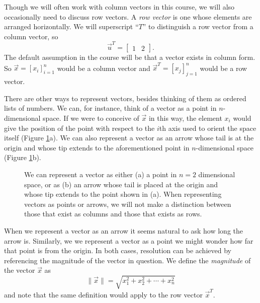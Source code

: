 \documentclass[../book.tex]{subfiles}
\begin{document}
Though we will often work with column vectors in this course, we will also occasionally need to discuss row vectors. A \emph{row vector} is one whose elements are arranged horizontally. We will superscript ``\(T\)'' to distinguish a row vector from a column vector, so
\begin{equation}\label{eq:vec-3}
\vec{u}^{ T} 
=
\begin{bmatrix}
  1 & 2
\end{bmatrix}.
\end{equation}
The default assumption in the course will be that a vector exists in column form. So \(\vec{x} = [x_i]_{i=1}^n\) would be a column vector and \(\vec{x}^{ T} = [x_j]_{j=1}^n\) would be a row vector.

There are other ways to represent vectors, besides thinking of them as ordered lists of numbers. We can, for instance, think of a vector as a point in \(n\)-dimensional space. If we were to conceive of \(\vec{x}\) in this way, the element \(x_i\) would give the position of the point with respect to the \(i\)th axis used to orient the space itself (Figure \ref{fig:vector_rep}a). We can also represent a vector as an arrow whose tail is at the origin and whose tip extends to the aforementioned point in \(n\)-dimensional space (Figure \ref{fig:vector_rep}b).

\begin{figure}[htbp]
  \centering
  \caption{We can represent a vector as either (a) a point in \(n=2\) dimensional space, or as (b) an arrow whose tail is placed at the origin and whose tip extends to the point shown in (a). When representing vectors as points or arrows, we will not make a distinction between those that exist as columns and those that exists as rows.}
  \label{fig:vector_rep}
\end{figure}

When we represent a vector as an arrow it seems natural to ask how long the arrow is. Similarly, we we represent a vector as a point we might wonder how far that point is from the origin. In both cases, resolution can be achieved by referencing the magnitude of the vector in question. We define the \emph{magnitude} of the vector \(\vec{x}\) as
\begin{equation}\label{eq:vec-4}
\| \vec{x}\| = \sqrt{ x_1^2 + x_2^2 + \cdots + x_n^2 }
\end{equation}
and note that the same definition would apply to the row vector \(\vec{x}^{T}\).
\end{document}
